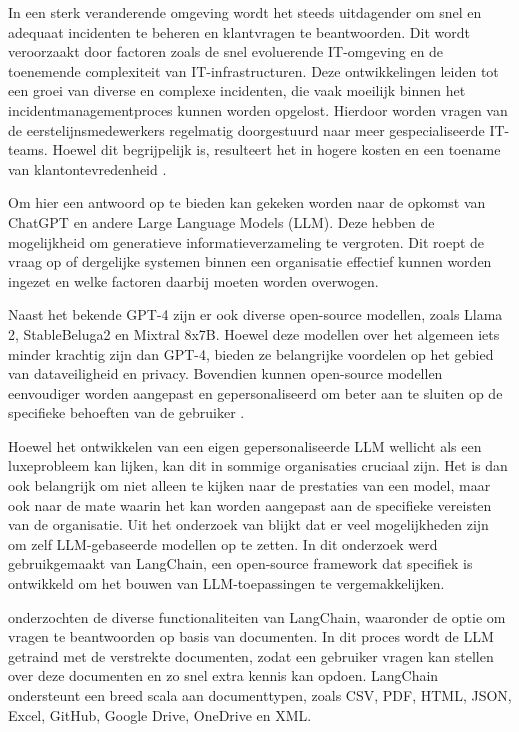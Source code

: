 In een sterk veranderende omgeving wordt het steeds uitdagender om snel en adequaat incidenten te beheren en klantvragen te beantwoorden. Dit wordt veroorzaakt door factoren zoals de snel evoluerende IT-omgeving en de toenemende complexiteit van IT-infrastructuren. Deze ontwikkelingen leiden tot een groei van diverse en complexe incidenten, die vaak moeilijk binnen het incidentmanagementproces kunnen worden opgelost. Hierdoor worden vragen van de eerstelijnsmedewerkers regelmatig doorgestuurd naar meer gespecialiseerde IT-teams. Hoewel dit begrijpelijk is, resulteert het in hogere kosten en een toename van klantontevredenheid \autocite{Schmidt2024}.

Om hier een antwoord op te bieden kan gekeken worden naar de opkomst van ChatGPT en andere Large Language Models (LLM). Deze hebben de mogelijkheid om generatieve informatieverzameling te vergroten. Dit roept de vraag op of dergelijke systemen binnen een organisatie effectief kunnen worden ingezet en welke factoren daarbij moeten worden overwogen.

Naast het bekende GPT-4 zijn er ook diverse open-source modellen, zoals Llama 2, StableBeluga2 en Mixtral 8x7B. Hoewel deze modellen over het algemeen iets minder krachtig zijn dan GPT-4, bieden ze belangrijke voordelen op het gebied van dataveiligheid en privacy. Bovendien kunnen open-source modellen eenvoudiger worden aangepast en gepersonaliseerd om beter aan te sluiten op de specifieke behoeften van de gebruiker \autocite{KernanFreire2024}.

Hoewel het ontwikkelen van een eigen gepersonaliseerde LLM wellicht als een luxeprobleem kan lijken, kan dit in sommige organisaties cruciaal zijn. Het is dan ook belangrijk om niet alleen te kijken naar de prestaties van een model, maar ook naar de mate waarin het kan worden aangepast aan de specifieke vereisten van de organisatie. Uit het onderzoek van \textcite{Topsakal2023} blijkt dat er veel mogelijkheden zijn om zelf LLM-gebaseerde modellen op te zetten. In dit onderzoek werd gebruikgemaakt van LangChain, een open-source framework dat specifiek is ontwikkeld om het bouwen van LLM-toepassingen te vergemakkelijken.

\textcite{Topsakal2023} onderzochten de diverse functionaliteiten van LangChain, waaronder de optie om vragen te beantwoorden op basis van documenten. In dit proces wordt de LLM getraind met de verstrekte documenten, zodat een gebruiker vragen kan stellen over deze documenten en zo snel extra kennis kan opdoen. LangChain ondersteunt een breed scala aan documenttypen, zoals CSV, PDF, HTML, JSON, Excel, GitHub, Google Drive, OneDrive en XML.

